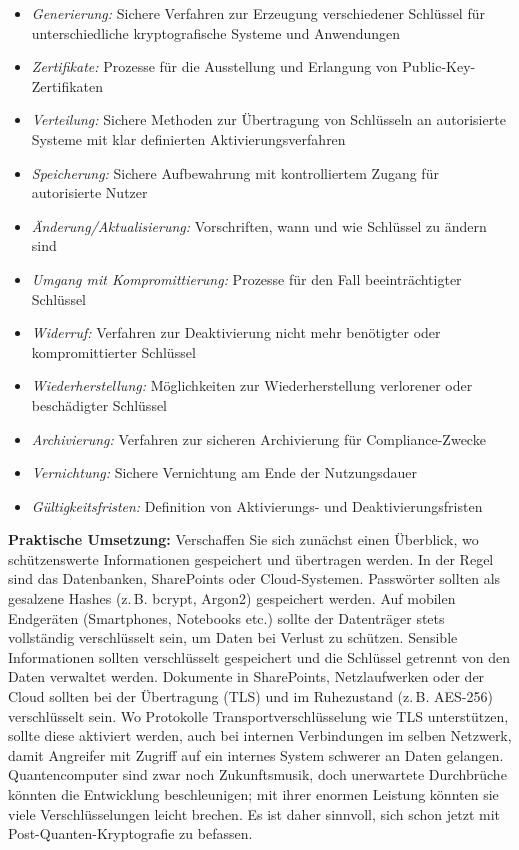 \begin{itemize}
\item \textit{Generierung:} Sichere Verfahren zur Erzeugung verschiedener Schlüssel für unterschiedliche kryptografische Systeme und Anwendungen
\item \textit{Zertifikate:} Prozesse für die Ausstellung und Erlangung von Public-Key-Zertifikaten
\item \textit{Verteilung:} Sichere Methoden zur Übertragung von Schlüsseln an autorisierte Systeme mit klar definierten Aktivierungsverfahren
\item \textit{Speicherung:} Sichere Aufbewahrung mit kontrolliertem Zugang für autorisierte Nutzer
\item \textit{Änderung/Aktualisierung:} Vorschriften, wann und wie Schlüssel zu ändern sind
\item \textit{Umgang mit Kompromittierung:} Prozesse für den Fall beeinträchtigter Schlüssel
\item \textit{Widerruf:} Verfahren zur Deaktivierung nicht mehr benötigter oder kompromittierter Schlüssel
\item \textit{Wiederherstellung:} Möglichkeiten zur Wiederherstellung verlorener oder beschädigter Schlüssel
\item \textit{Archivierung:} Verfahren zur sicheren Archivierung für Compliance-Zwecke
\item \textit{Vernichtung:} Sichere Vernichtung am Ende der Nutzungsdauer
\item \textit{Gültigkeitsfristen:} Definition von Aktivierungs- und Deaktivierungsfristen
\end{itemize}

\textbf{Praktische Umsetzung:} Verschaffen Sie sich zunächst einen Überblick, wo schützenswerte Informationen gespeichert und übertragen werden. In der Regel sind das Datenbanken, SharePoints oder Cloud-Systemen. Passwörter sollten als gesalzene Hashes (z.\,B. bcrypt, Argon2) gespeichert werden. Auf mobilen Endgeräten (Smartphones, Notebooks etc.) sollte der Datenträger stets vollständig verschlüsselt sein, um Daten bei Verlust zu schützen. Sensible Informationen sollten verschlüsselt gespeichert und die Schlüssel getrennt von den Daten verwaltet werden. Dokumente in SharePoints, Netzlaufwerken oder der Cloud sollten bei der Übertragung (TLS) und im Ruhezustand (z.\,B. AES-256) verschlüsselt sein. Wo Protokolle Transportverschlüsselung wie TLS unterstützen, sollte diese aktiviert werden, auch bei internen Verbindungen im selben Netzwerk, damit Angreifer mit Zugriff auf ein internes System schwerer an Daten gelangen. Quantencomputer sind zwar noch Zukunftsmusik, doch unerwartete Durchbrüche könnten die Entwicklung beschleunigen; mit ihrer enormen Leistung könnten sie viele Verschlüsselungen leicht brechen. Es ist daher sinnvoll, sich schon jetzt mit Post-Quanten-Kryptografie zu befassen.

